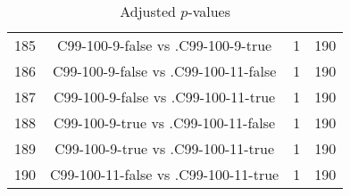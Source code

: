 \documentclass[a4paper,10pt]{article}
\begin{document}
\begin{landscape}
\begin{table}[!htp]
\begin{tabular}{cccc}
185&C99-100-9-false vs .C99-100-9-true&1&190\\
186&C99-100-9-false vs .C99-100-11-false&1&190\\
187&C99-100-9-false vs .C99-100-11-true&1&190\\
188&C99-100-9-true vs .C99-100-11-false&1&190\\
189&C99-100-9-true vs .C99-100-11-true&1&190\\
190&C99-100-11-false vs .C99-100-11-true&1&190\\
\hline
\end{tabular}
\caption{Adjusted $p$-values}
\end{table}

\end{landscape}
\end{document}
